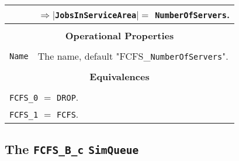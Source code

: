 \documentclass[12pt]{book}
\begin{document}
\begin{tabular}{|l|l|l|l|}
    \multicolumn{1}{|l}{}
  & \multicolumn{3}{l|}{$\Rightarrow |$\lstinline|JobsInServiceArea|$| =$ \lstinline|NumberOfServers|.} \\
\hline
\multicolumn{4}{|c|}{} \\
\multicolumn{4}{|c|}{\bf Operational Properties} \\
\multicolumn{4}{|c|}{} \\
\hline
\lstinline|Name| & \multicolumn{3}{|l|}{The name, default "FCFS\_\lstinline{NumberOfServers}".} \\
\hline
\multicolumn{4}{|c|}{} \\
\multicolumn{4}{|c|}{\bf Equivalences} \\
\multicolumn{4}{|c|}{} \\
\hline
\multicolumn{4}{|l|}{\lstinline|FCFS_0| $=$ \lstinline|DROP|.} \\
\multicolumn{4}{|l|}{\lstinline|FCFS_1| $=$ \lstinline|FCFS|.} \\
\hline
\end{tabular}

\subsection{The \lstinline{FCFS_B_c} \lstinline{SimQueue}}
\end{document}
